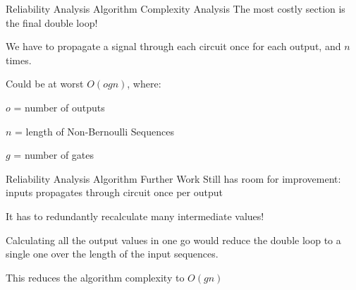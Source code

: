 \documentclass[12pt]{beamer}
\begin{document}
\begin{frame}{Reliability Analysis Algorithm \small Complexity Analysis}
The most costly section is the final double loop!
\vspace{0.25cm}

We have to propagate a signal through each circuit once for each output, and $n$ times.
\vspace{0.25cm}

Could be at worst $O(ogn)$, where:

$o$ = number of outputs

$n$ = length of Non-Bernoulli Sequences

$g$ = number of gates
\end{frame}

\begin{frame}[fragile]{Reliability Analysis Algorithm \small Further Work}
Still has room for improvement: inputs propagates through circuit once per output
\vspace{0.25cm}

It has to redundantly recalculate many intermediate values!
\vspace{0.25cm}

Calculating all the output values in one go would reduce the double loop to a single one over the length of the input sequences.
\vspace{0.25cm}

This reduces the algorithm complexity to $O(gn)$
\end{frame}
\end{document}
